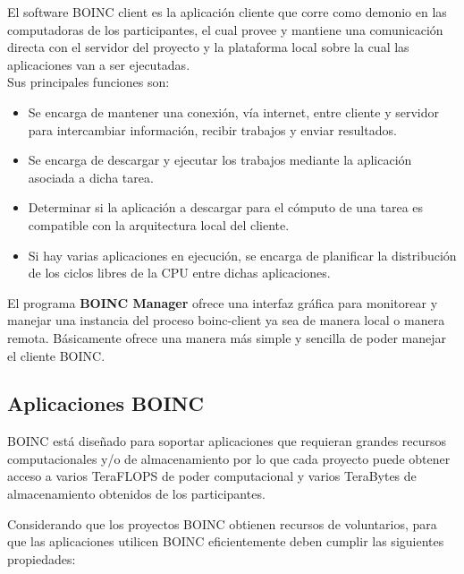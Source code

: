 El software BOINC client es la aplicación cliente que corre como demonio en las computadoras de los participantes, el cual provee y mantiene una comunicación directa con el servidor del proyecto y la plataforma local sobre la cual las aplicaciones van a ser ejecutadas.
\\
Sus principales funciones son:
\begin{itemize}
\item Se encarga de mantener una conexión, vía internet, entre cliente y servidor para intercambiar información, recibir trabajos y enviar resultados.
\item Se encarga de descargar y ejecutar los trabajos mediante la aplicación asociada a dicha tarea.
\item Determinar si la aplicación a descargar para el cómputo de una tarea es compatible con la arquitectura local del cliente. 
\item Si hay varias aplicaciones en ejecución, se encarga de planificar la distribución de los ciclos libres de la CPU entre dichas aplicaciones.
\end{itemize} 

El programa \textbf{BOINC Manager} ofrece una interfaz gráfica para monitorear y manejar una instancia del proceso boinc-client ya sea de manera local o manera remota. Básicamente ofrece una manera más simple y sencilla de poder manejar el cliente BOINC.

\subsection{Aplicaciones BOINC}

BOINC está diseñado para soportar aplicaciones que requieran grandes recursos computacionales y/o de almacenamiento por lo que cada proyecto puede obtener acceso a varios TeraFLOPS de poder computacional y varios TeraBytes de almacenamiento obtenidos de los participantes. 

Considerando que los proyectos BOINC obtienen recursos de voluntarios, para que las aplicaciones utilicen BOINC eficientemente deben cumplir las siguientes propiedades:

